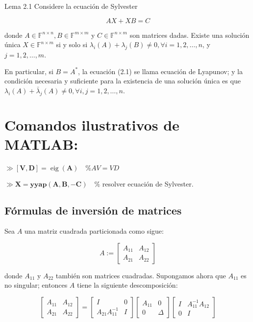 \documentclass[11pt]{article}
\begin{document}
Lema 2.1 Considere la ecuación de Sylvester


\begin{equation*}
A X+X B=C \tag{2.1}
\end{equation*}


donde $A \in \mathbb{F}^{n \times n}, B \in \mathbb{F}^{m \times m}$ y $C \in \mathbb{F}^{n \times m}$ son matrices dadas. Existe una solución única $X \in \mathbb{F}^{n \times m}$ si y solo si $\lambda_{i}(A)+\lambda_{j}(B) \neq 0, \forall i=1,2, \ldots, n$, y $j=1,2, \ldots, m$.

En particular, si $B=A^{*}$, la ecuación (2.1) se llama ecuación de Lyapunov; y la condición necesaria y suficiente para la existencia de una solución única es que $\lambda_{i}(A)+\bar{\lambda}_{j}(A) \neq 0, \forall i, j=1,2, \ldots, n$.

\section*{Comandos ilustrativos de MATLAB:}
$\gg[\mathbf{V}, \mathbf{D}]=\operatorname{eig}(\mathbf{A}) \quad \% A V=V D$

$\gg \mathbf{X}=\mathbf{y} \mathbf{y a p}(\mathbf{A}, \mathbf{B},-\mathbf{C}) \quad \%$ resolver ecuación de Sylvester.

\subsection*{Fórmulas de inversión de matrices}
Sea $A$ una matriz cuadrada particionada como sigue:

$$
A:=\left[\begin{array}{ll}
A_{11} & A_{12} \\
A_{21} & A_{22}
\end{array}\right]
$$

donde $A_{11}$ y $A_{22}$ también son matrices cuadradas. Supongamos ahora que $A_{11}$ es no singular; entonces $A$ tiene la siguiente descomposición:

$$
\left[\begin{array}{ll}
A_{11} & A_{12} \\
A_{21} & A_{22}
\end{array}\right]=\left[\begin{array}{cc}
I & 0 \\
A_{21} A_{11}^{-1} & I
\end{array}\right]\left[\begin{array}{cc}
A_{11} & 0 \\
0 & \Delta
\end{array}\right]\left[\begin{array}{cc}
I & A_{11}^{-1} A_{12} \\
0 & I
\end{array}\right]
$$
\end{document}
